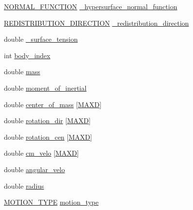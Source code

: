 \begin{DoxyCompactItemize}
\item 
\hyperlink{fuserint_8h_a3e3bd260955ac448c42e60e8db22ab36}{N\+O\+R\+M\+A\+L\+\_\+\+F\+U\+N\+C\+T\+I\+ON} \hyperlink{struct___f___h_y_p_e_r___s_u_r_f_a39224565b9f8886e6bd1311b8cc2d4f9}{\+\_\+hypersurface\+\_\+normal\+\_\+function}
\item 
\hyperlink{fuserint_8h_a629ef72c8f466d71aac232a468417f65}{R\+E\+D\+I\+S\+T\+R\+I\+B\+U\+T\+I\+O\+N\+\_\+\+D\+I\+R\+E\+C\+T\+I\+ON} \hyperlink{struct___f___h_y_p_e_r___s_u_r_f_a45b337459a850bf91d3564badad861ea}{\+\_\+redistribution\+\_\+direction}
\item 
double \hyperlink{struct___f___h_y_p_e_r___s_u_r_f_afa22dafed107ddd39a80a5ce628847c2}{\+\_\+surface\+\_\+tension}
\item 
int \hyperlink{struct___f___h_y_p_e_r___s_u_r_f_a1d58f9f3a46a574af8558dc92e8b7d16}{body\+\_\+index}
\item 
double \hyperlink{struct___f___h_y_p_e_r___s_u_r_f_a3d4d1c5a964ebd61909b2f5289005282}{mass}
\item 
double \hyperlink{struct___f___h_y_p_e_r___s_u_r_f_a99c7329b4ce71747b974d83cc16fd316}{moment\+\_\+of\+\_\+inertial}
\item 
double \hyperlink{struct___f___h_y_p_e_r___s_u_r_f_adec05d76ec600a1754ffbd0a5e742ea8}{center\+\_\+of\+\_\+mass} \mbox{[}\hyperlink{geom_8h_aabfcbcb5ac86a1edac4035264bc7d2b8ac79558c6c6666a44ddf7e701241b8211}{M\+A\+XD}\mbox{]}
\item 
double \hyperlink{struct___f___h_y_p_e_r___s_u_r_f_a8e96b8a0dcbef6018f180c1967d5e028}{rotation\+\_\+dir} \mbox{[}\hyperlink{geom_8h_aabfcbcb5ac86a1edac4035264bc7d2b8ac79558c6c6666a44ddf7e701241b8211}{M\+A\+XD}\mbox{]}
\item 
double \hyperlink{struct___f___h_y_p_e_r___s_u_r_f_a3e825dfe04eac5ea4bb834ddaf7d04dc}{rotation\+\_\+cen} \mbox{[}\hyperlink{geom_8h_aabfcbcb5ac86a1edac4035264bc7d2b8ac79558c6c6666a44ddf7e701241b8211}{M\+A\+XD}\mbox{]}
\item 
double \hyperlink{struct___f___h_y_p_e_r___s_u_r_f_a4cc90163bf610b04abee4acce99426c3}{cm\+\_\+velo} \mbox{[}\hyperlink{geom_8h_aabfcbcb5ac86a1edac4035264bc7d2b8ac79558c6c6666a44ddf7e701241b8211}{M\+A\+XD}\mbox{]}
\item 
double \hyperlink{struct___f___h_y_p_e_r___s_u_r_f_a4542a88a2a45d288268a39805ab343a5}{angular\+\_\+velo}
\item 
double \hyperlink{struct___f___h_y_p_e_r___s_u_r_f_ae7bc2edb7b3232719c3ef6e5ef1b83ad}{radius}
\item 
\hyperlink{fuserint_8h_aa4aab5610f9b318a79db26e3b59a18cf}{M\+O\+T\+I\+O\+N\+\_\+\+T\+Y\+PE} \hyperlink{struct___f___h_y_p_e_r___s_u_r_f_a0bd1e6abfaa067f7f6bcd9f10c719e56}{motion\+\_\+type}
\end{DoxyCompactItemize}


